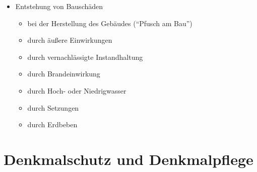 \documentclass[fleqn,twoside,dvipsnames]{article}
\begin{document}
\begin{itemize}
\begin{itemize}
\begin{itemize}
                        \end{itemize}
                    \item Entstehung von Bauschäden \label{Bauschäden}
                        \begin{itemize}
                            \item bei der Herstellung des Gebäudes (\enquote{Pfusch am Bau})
                            \item durch äußere Einwirkungen
                            \item durch vernachlässigte Instandhaltung
                            \item durch Brandeinwirkung
                            \item durch Hoch- oder Niedrigwasser
                            \item durch Setzungen
                            \item durch Erdbeben
                        \end{itemize}
                \end{itemize}
        \end{itemize}

\newpage
    
\section{Denkmalschutz und Denkmalpflege}
\end{document}
